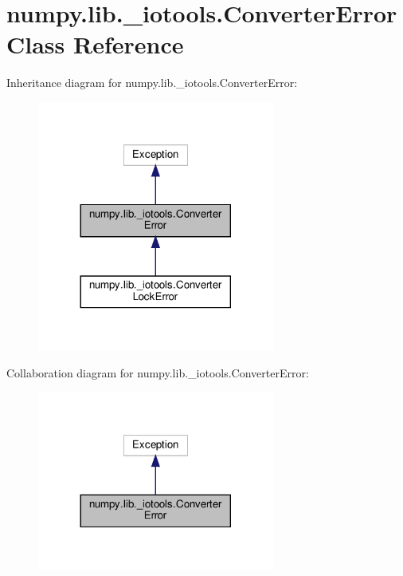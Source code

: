 \hypertarget{classnumpy_1_1lib_1_1__iotools_1_1ConverterError}{}\section{numpy.\+lib.\+\_\+iotools.\+Converter\+Error Class Reference}
\label{classnumpy_1_1lib_1_1__iotools_1_1ConverterError}


Inheritance diagram for numpy.\+lib.\+\_\+iotools.\+Converter\+Error\+:
\nopagebreak
\begin{figure}[H]
\begin{center}
\leavevmode
\includegraphics[width=221pt]{classnumpy_1_1lib_1_1__iotools_1_1ConverterError__inherit__graph}
\end{center}
\end{figure}


Collaboration diagram for numpy.\+lib.\+\_\+iotools.\+Converter\+Error\+:
\nopagebreak
\begin{figure}[H]
\begin{center}
\leavevmode
\includegraphics[width=221pt]{classnumpy_1_1lib_1_1__iotools_1_1ConverterError__coll__graph}
\end{center}
\end{figure}


